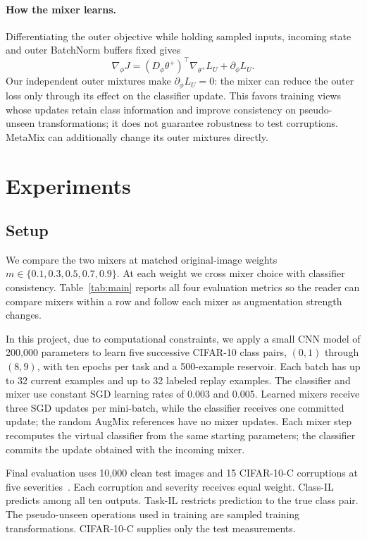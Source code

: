 \documentclass[10pt,twocolumn,letterpaper]{article}
\begin{document}
\paragraph{How the mixer learns.}
Differentiating the outer objective while holding sampled inputs, incoming state and outer BatchNorm buffers fixed gives
\begin{equation}
      \nabla_\phi J=(D_\phi\theta^+)^\top\nabla_{\theta^+}L_U+\partial_\phi L_U.
\end{equation}
Our independent outer mixtures make $\partial_\phi L_U=0$: the mixer can reduce the outer loss only through its effect on the classifier update. This favors training views whose updates retain class information and improve consistency on pseudo-unseen transformations; it does not guarantee robustness to test corruptions. MetaMix can additionally change its outer mixtures directly.

\section{Experiments}
\subsection{Setup}

We compare the two mixers at matched original-image weights $m\in\{0.1,0.3,0.5,0.7,0.9\}$. At each weight we cross mixer choice with classifier consistency. Table~\ref{tab:main} reports all four evaluation metrics so the reader can compare mixers within a row and follow each mixer as augmentation strength changes.

In this project, due to computational constraints, we apply a small CNN model of 200,000 parameters to learn five successive CIFAR-10 class pairs, $(0,1)$ through $(8,9)$, with ten epochs per task and a 500-example reservoir. Each batch has up to 32 current examples and up to 32 labeled replay examples. The classifier and mixer use constant SGD learning rates of 0.003 and 0.005. Learned mixers receive three SGD updates per mini-batch, while the classifier receives one committed update; the random AugMix references have no mixer updates. Each mixer step recomputes the virtual classifier from the same starting parameters; the classifier commits the update obtained with the incoming mixer.

Final evaluation uses 10,000 clean test images and 15 CIFAR-10-C corruptions at five severities~\cite{hendrycks2019benchmarking}. Each corruption and severity receives equal weight. Class-IL predicts among all ten outputs. Task-IL restricts prediction to the true class pair. The pseudo-unseen operations used in training are sampled training transformations. CIFAR-10-C supplies only the test measurements.
\end{document}
